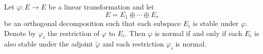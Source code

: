 Let $\varphi: E \rightarrow E$ be a linear transformation and let
$$E = E_1 \oplus \cdots \oplus E_r$$
be an orthogonal decomposition such that each subspace $E_i$ is stable under $\varphi$. Denote by $\varphi_i$ the restriction of $\varphi$ to $E_i$. Then $\varphi$ is normal if and only if each $E_i$ is also stable under the adjoint $\tilde{\varphi}$ and each restriction $\varphi_i$ is normal.
